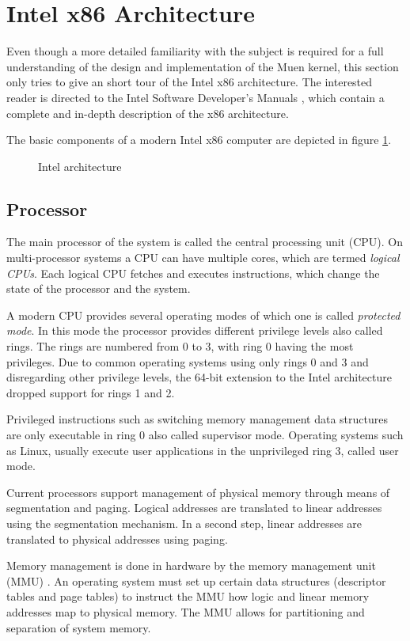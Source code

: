 \section{Intel x86 Architecture}
Even though a more detailed familiarity with the subject is required for a full
understanding of the design and implementation of the Muen kernel, this section
only tries to give an short tour of the Intel x86 architecture. The interested
reader is directed to the Intel Software Developer's Manuals \cite{IntelSDM},
which contain a complete and in-depth description of the x86 architecture.

The basic components of a modern Intel x86 computer are depicted in figure
\ref{fig:intel-architecture}.

\begin{figure}
	\caption{Intel architecture}
	\label{fig:intel-architecture}
\end{figure}

\subsection{Processor}
The main processor of the system is called the central processing unit (CPU). On
multi-processor systems a CPU can have multiple cores, which are termed
\emph{logical CPUs}. Each logical CPU fetches and executes instructions, which
change the state of the processor and the system.

A modern CPU provides several operating modes of which one is called
\emph{protected mode}. In this mode the processor provides different privilege
levels also called rings. The rings are numbered from 0 to 3, with ring 0 having
the most privileges. Due to common operating systems using only rings 0 and 3
and disregarding other privilege levels, the 64-bit extension to the Intel
architecture dropped support for rings 1 and 2.

Privileged instructions such as switching memory management data structures are
only executable in ring 0 also called supervisor mode. Operating systems such as
Linux, usually execute user applications in the unprivileged ring 3, called user
mode.

Current processors support management of physical memory through means of
segmentation and paging. Logical addresses are translated to linear addresses
using the segmentation mechanism. In a second step, linear addresses are
translated to physical addresses using paging.

Memory management is done in hardware by the memory management unit (MMU)
. An operating system must set up certain data structures (descriptor
tables and page tables) to instruct the MMU how logic and linear memory
addresses map to physical memory. The MMU allows for partitioning and separation
of system memory.

